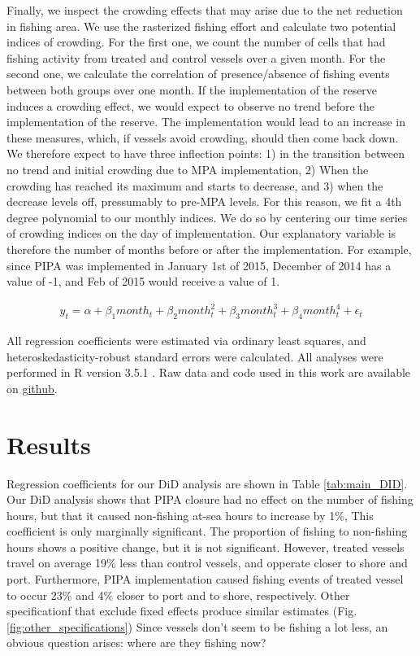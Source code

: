 \documentclass[9pt,twoside,lineno]{pnas-new}
\begin{document}
Finally, we inspect the crowding effects that may arise due to the net reduction
in fishing area. We use the rasterized fishing effort and calculate two
potential indices of crowding. For the first one, we count the number of cells
that had fishing activity from treated and control vessels over a given month. For the second one,
we calculate the correlation of presence/absence of fishing events between both groups
over one month. If the implementation of the reserve induces a crowding effect,
we would expect to observe no trend before the implementation of the reserve.
The implementation would lead to an increase in these measures, which, 
if vessels avoid crowding, should then come back down. We therefore expect to
have three inflection points: 1) in the transition between no trend and initial crowding due to MPA
implementation, 2) When the crowding has reached its maximum and starts to decrease,
and 3) when the decrease levels off, pressumably to pre-MPA levels.
For this reason, we fit a 4th degree polynomial to our monthly indices. We do so by
centering our time series of crowding indices on the day of implementation. Our
explanatory variable is therefore the number of months before or after the implementation.
For example, since PIPA was implemented in January 1st of 2015, December of 2014 
has a value of -1, and Feb of 2015 would receive a value of 1.

\begin{figure}[h]
\begin{align*}
y_t = \alpha + \beta_1 month_t + \beta_2 month_t^2 + \beta_3 month_t^3 + \beta_4 month_t ^4 + \epsilon_t
\end{align*}
\end{figure}

All regression coefficients were estimated via ordinary least squares,
and heteroskedasticity-robust standard errors were calculated. All analyses
were performed in R version 3.5.1 \citep{rcore_2018}. Raw data and code
used in this work are available on
\href{https://github.com/jcvdav/MPA_displacement}{github}.

\section{Results}\label{results}

Regression coefficients for our DiD analysis are shown in Table
\ref{tab:main_DID}. Our DiD analysis shows that PIPA closure
had no effect on the number of fishing hours, but that it caused
non-fishing at-sea hours to increase by 1\%, This coefficient is
only marginally significant. The proportion of
fishing to non-fishing hours shows a positive change, but it is not
significant. However, treated vessels travel on average 19\% less
than control vessels, and opperate closer to shore and port.
Furthermore, PIPA implementation caused fishing events of treated
vessel to occur 23\% and 4\% closer to port and to shore, respectively.
Other specificationf that exclude fixed effects produce similar estimates (Fig. \ref{fig:other_specifications})
Since vessels don't seem to be fishing a lot less, an obvious question arises: where are they
fishing now?
\end{document}
